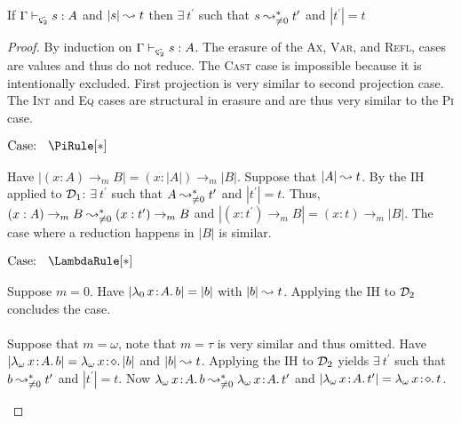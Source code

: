 \begin{lemma}
    \label{lem:5:strict_erase_red_step}
    If $\Gamma \vdash_{\ced^\text{-}} s : A$ and $|s| \leadsto t$ then $\exists\ t^\prime$ such that $s \leadsto^*_{\neq 0} t^\prime$ and $|t^\prime| = t$
\end{lemma}
\begin{proof}
    By induction on $\Gamma \vdash_{\ced^\text{-}} s : A$.
    The erasure of the \textsc{Ax}, \textsc{Var}, and \textsc{Refl}, cases are values and thus do not reduce.
    The \textsc{Cast} case is impossible because it is intentionally excluded.
    First projection is very similar to second projection case.
    The \textsc{Int} and \textsc{Eq} cases are structural in erasure and are thus very similar to the \textsc{Pi} case.

    $\text{Case: }\begin{array}{c} \PiRule[*] \end{array}$
    \begin{proofcase}
        Have $|(x : A) \to_m B| = (x : |A|) \to_m |B|$.
        Suppose that $|A| \leadsto t$.
        By the IH applied to $\mathcal{D}_{1}$: $\exists\ t^\prime$ such that $A \leadsto^*_{\neq 0} t^\prime$ and $|t^\prime| = t$.
        Thus, $(x : A) \to_m B \leadsto^*_{\neq 0} (x : t^\prime) \to_m B$ and $|(x : t^\prime) \to_m B| = (x : t) \to_m |B|$.
        The case where a reduction happens in $|B|$ is similar.
    \end{proofcase}

    $\text{Case: }\begin{array}{c} \LambdaRule[*] \end{array}$
    \begin{proofcase}
        Suppose $m = 0$.
        Have $|{\lambda_0}\, x\! : \! A.\, b| = |b|$ with $|b| \leadsto t$.
        Applying the IH to $\mathcal{D}_{2}$ concludes the case.
        \\ \\
        Suppose that $m = \omega$, note that $m = \tau$ is very similar and thus omitted.
        Have $|{\lambda_\omega}\, x\! : \! A.\, b| = {\lambda_\omega}\, x\! : \! \diamond.\, |b|$ and $|b| \leadsto t$.
        Applying the IH to $\mathcal{D}_{2}$ yields $\exists\ t^\prime$ such that $b \leadsto^*_{\neq 0} t^\prime$ and $|t^\prime| = t$.
        Now ${\lambda_\omega}\, x\! : \! A.\, b \leadsto^*_{\neq 0} {\lambda_\omega}\, x\! : \! A.\, t^\prime$ and $|{\lambda_\omega}\, x\! : \! A.\, t^\prime| = {\lambda_\omega}\, x\! : \! \diamond.\, t$.
    \end{proofcase}


\end{proof}
